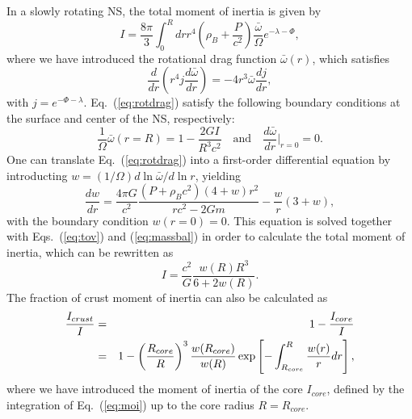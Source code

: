 In a slowly rotating NS, the total moment of inertia is given
by~\cite{Hartle1967}
%
\begin{equation}
  I = \frac{8\pi}{3}\int_0^R dr r^4\left(\rho_B +
  \frac{P}{c^2}\right)
  \frac{\bar{\omega}}{\Omega}e^{-\lambda-\Phi}\label{eq:moi},
\end{equation}
%
where we have introduced the rotational drag function $\bar{\omega}(r)$, which
satisfies
%
\begin{equation}
  \frac{d}{dr}\left(r^4j\frac{d\bar{\omega}}{dr}\right) =
  -4r^3\bar{\omega}\frac{dj}{dr},\label{eq:rotdrag}
\end{equation}
%
with $j=e^{-\Phi-\lambda}$. Eq.~(\ref{eq:rotdrag}) satisfy the following
boundary conditions at the surface and center of the NS, respectively:
%
\begin{equation}
  \frac{1}{\Omega}\bar{\omega}(r=R) = 1 - \frac{2GI}{R^3c^2} \quad \text{and} 
  \quad \frac{d\bar{\omega}}{dr}\bigg|_{r=0} = 0.
\end{equation}
%
One can translate Eq.~(\ref{eq:rotdrag}) into a first-order differential
equation by introducting $w = (1/\Omega)d\ln\bar{\omega}/d\ln r$, yielding
%
\begin{equation}
  \frac{dw}{dr} = \frac{4\pi G}{c^2}\frac{(P+\rho_Bc^2)(4+w)r^2}{rc^2-2Gm} -
  \frac{w}{r}(3+w)\label{eq:rotdrag2},
\end{equation}
%
with the boundary condition $w(r=0) = 0$. This equation is solved together with 
Eqs.~(\ref{eq:tov}) and (\ref{eq:massbal}) in order to calculate the total 
moment of inertia, which can be rewritten as
%
\begin{equation}
  I = \frac{c^2}{G}\frac{w(R)R^3}{6 + 2w(R)}.
\end{equation}
%
The fraction of crust moment of inertia can also be calculated 
as~\cite{Lim2019}
%
\begin{eqnarray}
  \frac{I_{crust}}{I} &=& 1 - \frac{I_{core}}{I}\notag\\
                      &=& 1 - \left(\frac{R_{core}}{R}\right)^3
                      \frac{w(R_{core})}{w(R)}
                      \exp\left[-\int_{R_{core}}^{R}\frac{w(r)}{r}dr\right],
\end{eqnarray}
%
where we have introduced the moment of inertia of the core $I_{core}$, defined
by the integration of Eq.~(\ref{eq:moi}) up to the core radius $R=R_{core}$.

